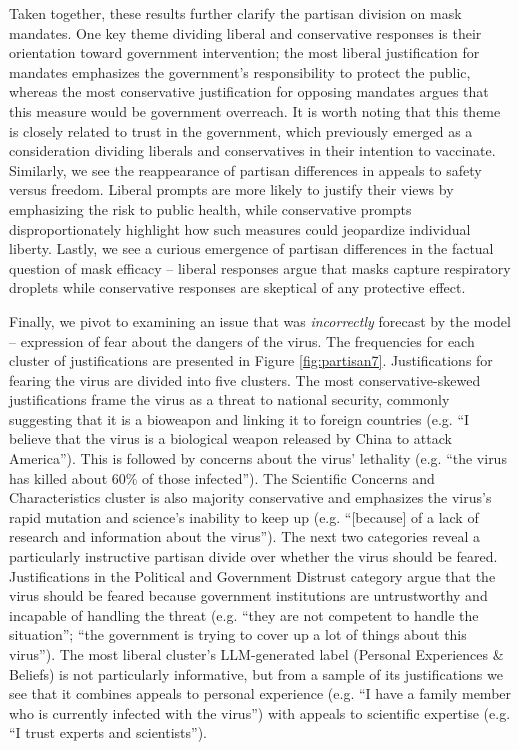 \documentclass{article} %
\begin{document}
Taken together, these results further clarify the partisan division on mask mandates. One key
theme dividing liberal and conservative responses is their orientation toward government
intervention; the most liberal justification for mandates emphasizes the government's responsibility
to protect the public, whereas the most conservative justification for opposing mandates argues that
this measure would be government overreach. It is worth noting that this theme is closely related to
trust in the government, which previously emerged as a consideration dividing liberals and
conservatives in their intention to vaccinate. Similarly, we see the reappearance of partisan
differences in appeals to safety versus freedom. Liberal prompts are more likely to justify
their views by emphasizing the risk to public health, while conservative prompts disproportionately
highlight how such measures could jeopardize individual liberty. Lastly, we see a curious emergence
of partisan differences in the factual question of mask efficacy -- liberal responses argue that
masks capture respiratory droplets while conservative responses are skeptical of any protective effect.

Finally, we pivot to examining an issue that was \emph{incorrectly}
forecast by the model -- expression of fear about the dangers of the
virus. The frequencies for each cluster of justifications are presented
in Figure \ref{fig:partisan7}. Justifications for fearing the virus are divided into five
clusters. The most conservative-skewed justifications frame the virus as
a threat to national security, commonly suggesting that it is a
bioweapon and linking it to foreign countries (e.g. ``I believe that the
virus is a biological weapon released by China to attack America'').
This is followed by concerns about the virus' lethality (e.g. ``the
virus has killed about 60\% of those infected''). The Scientific
Concerns and Characteristics cluster is also majority conservative and
emphasizes the virus's rapid mutation and science's inability to keep up
(e.g. ``{[}because{]} of a lack of research and information about the
virus''). The next two categories reveal a particularly instructive
partisan divide over whether the virus should be feared. Justifications
in the Political and Government Distrust category argue that the virus
should be feared because government institutions are untrustworthy and
incapable of handling the threat (e.g. ``they are not competent to
handle the situation''; ``the government is trying to cover up a lot of
things about this virus''). The most liberal cluster's LLM-generated
label (Personal Experiences \& Beliefs) is not particularly informative,
but from a sample of its justifications we see that it combines appeals
to personal experience (e.g. ``I have a family member who is currently
infected with the virus'') with appeals to scientific expertise (e.g.
``I trust experts and scientists'').
\end{document}
